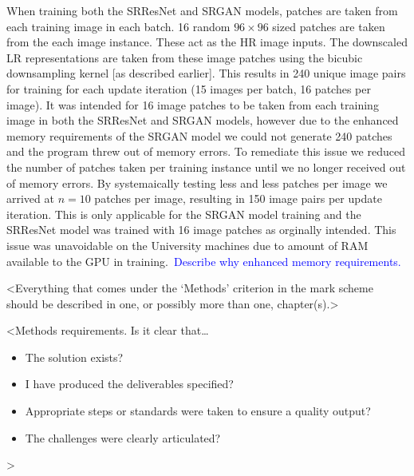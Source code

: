 When training both the SRResNet and SRGAN models, patches are taken from each training image in each batch. 16 random $96 \times 96$ sized patches are taken from the each image instance. These act as the HR image inputs. The downscaled LR representations are taken from these image patches using the bicubic downsampling kernel [as described earlier]. This results in 240 unique image pairs for training for each update iteration (15 images per batch, 16 patches per image). It was intended for 16 image patches to be taken from each training image in both the SRResNet and SRGAN models, however due to the enhanced memory requirements of the SRGAN model we could not generate 240 patches and the program threw out of memory errors. To remediate this issue we reduced the number of patches taken per training instance until we no longer received out of memory errors. By systemaically testing less and less patches per image we arrived at $n=10$ patches per image, resulting in 150 image pairs per update iteration. This is only applicable for the SRGAN model training and the SRResNet model was trained with 16 image patches as orginally intended. This issue was unavoidable on the University machines due to amount of RAM available to the GPU in training.\ \textcolor{blue}{Describe why enhanced memory requirements.} 
 
<Everything that comes under the `Methods' criterion in the mark scheme should be described in one, or possibly more than one, chapter(s).>

<Methods requirements. Is it clear that\dots
\begin{itemize}
    \item The solution exists?
    \item I have produced the deliverables specified?
    \item Appropriate steps or standards were taken to ensure a quality output?
    \item The challenges were clearly articulated?
\end{itemize}
>
